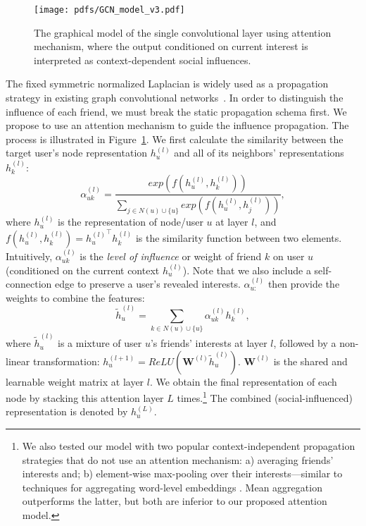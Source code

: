 \documentclass[sigconf]{acmart}
\begin{document}
\begin{figure}
\centering
\texttt{[image: pdfs/GCN\_model\_v3.pdf]}
\caption{The graphical model of the single convolutional layer using attention mechanism, where the output conditioned on current interest is interpreted as context-dependent social influences.}
\label{fig:attention_module}
\end{figure}

The fixed symmetric normalized Laplacian
is widely used as a propagation strategy in existing graph convolutional networks~\cite{defferrard2016convolutional,kipf2016semi}. In order to distinguish the influence of each friend, we must break the static propagation schema first.
We propose to use an attention mechanism to guide the influence propagation. The process is illustrated in Figure~\ref{fig:attention_module}. We first calculate the similarity between the target user's node representation $h_u^{(l)}$ and all of its neighbors' representations $h_k^{(l)}$:
\begin{equation}\label{eqt:alignment}
\alpha_{uk}^{(l)} = \frac{exp(f(h_u^{(l)},h_k^{(l)}))}{\sum_{j\in{N(u)\cup\{u\}}}exp(f(h_u^{(l)},h_j^{(l)}))},
\end{equation}
where $h_u^{(l)}$ is the representation of node/user $u$ at layer $l$, and $f(h_u^{(l)},h_k^{(l)}) = {h_u^{(l)}}^\top h_k^{(l)}$ is the similarity function between two elements. Intuitively, $\alpha_{uk}^{(l)}$ is the \emph{level of influence} or weight of friend $k$
on user $u$ (conditioned on the current context $h_u^{(l)}$). Note that we also include a self-connection edge to preserve a user's revealed interests. 
$\alpha_{u:}^{(l)}$ then provide the weights to combine the features:
\begin{equation}
\tilde{h}_u^{(l)} = \sum_{k\in{N(u)\cup\{u\}}}\alpha_{uk}^{(l)}h_k^{(l)},
\end{equation}
where $\tilde{h}_u^{(l)}$ is a mixture of user $u$'s friends' interests at layer $l$, followed by a non-linear transformation:
$h_u^{(l+1)} = ReLU(\textbf{W}^{(l)}\tilde{h}_u^{(l)}).$ $\textbf{W}^{(l)}$ is the shared and learnable weight matrix at layer $l$. We obtain the final representation of each node by stacking this attention layer $L$ times.\footnote{We also tested our model with two popular context-independent propagation strategies that do not use an attention mechanism: a) averaging friends' interests and; b) element-wise max-pooling over their interests---similar to techniques for aggregating word-level embeddings \cite{weston2014tagspace}. Mean aggregation outperforms the latter, but both are inferior to our proposed attention model.} The combined (social-influenced) representation is denoted by $h_u^{(L)}$.
\end{document}
